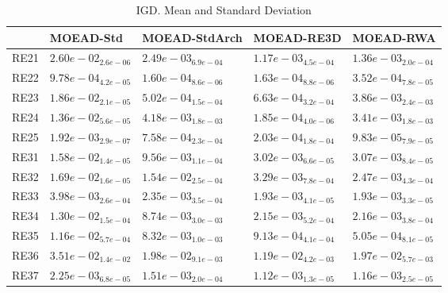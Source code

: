 \documentclass{article}
\begin{document}
\begin{table}
\caption{IGD. Mean and Standard Deviation}
\label{table: IGD}
\centering
\begin{scriptsize}
\begin{tabular}{lllll}
\hline & MOEAD-Std & MOEAD-StdArch & MOEAD-RE3D &  MOEAD-RWA\\
\hline 
RE21 & $  2.60e-02_{ 2.6e-06}$ & $  2.49e-03_{ 6.9e-04}$ & \cellcolor{gray95}$  1.17e-03_{ 4.5e-04}$ & \cellcolor{gray25}$  1.36e-03_{ 2.0e-04}$ \\
RE22 & $  9.78e-04_{ 4.2e-05}$ & \cellcolor{gray95}$  1.60e-04_{ 8.6e-06}$ & \cellcolor{gray25}$  1.63e-04_{ 8.8e-06}$ & $  3.52e-04_{ 7.8e-05}$ \\
RE23 & $  1.86e-02_{ 2.1e-05}$ & \cellcolor{gray95}$  5.02e-04_{ 1.5e-04}$ & \cellcolor{gray25}$  6.63e-04_{ 3.2e-04}$ & $  3.86e-03_{ 2.4e-03}$ \\
RE24 & $  1.36e-02_{ 5.6e-05}$ & $  4.18e-03_{ 1.8e-03}$ & \cellcolor{gray95}$  1.85e-04_{ 4.0e-06}$ & \cellcolor{gray25}$  3.41e-03_{ 1.8e-03}$ \\
RE25 & $  1.92e-03_{ 2.9e-07}$ & $  7.58e-04_{ 2.3e-04}$ & \cellcolor{gray25}$  2.03e-04_{ 1.8e-04}$ & \cellcolor{gray95}$  9.83e-05_{ 7.9e-05}$ \\
RE31 & $  1.58e-02_{ 1.4e-05}$ & $  9.56e-03_{ 1.1e-04}$ & \cellcolor{gray95}$  3.02e-03_{ 6.6e-05}$ & \cellcolor{gray25}$  3.07e-03_{ 8.4e-05}$ \\
RE32 & $  1.69e-02_{ 1.6e-05}$ & $  1.54e-02_{ 2.5e-04}$ & \cellcolor{gray25}$  3.29e-03_{ 7.8e-04}$ & \cellcolor{gray95}$  2.47e-03_{ 4.3e-04}$ \\
RE33 & $  3.98e-03_{ 2.6e-04}$ & $  2.35e-03_{ 3.5e-04}$ & \cellcolor{gray25}$  1.93e-03_{ 4.1e-05}$ & \cellcolor{gray95}$  1.93e-03_{ 3.3e-05}$ \\
RE34 & $  1.30e-02_{ 1.5e-04}$ & $  8.74e-03_{ 3.0e-03}$ & \cellcolor{gray95}$  2.15e-03_{ 5.2e-04}$ & \cellcolor{gray25}$  2.16e-03_{ 3.8e-04}$ \\
RE35 & $  1.16e-02_{ 5.7e-04}$ & $  8.32e-03_{ 1.0e-03}$ & \cellcolor{gray25}$  9.13e-04_{ 4.1e-04}$ & \cellcolor{gray95}$  5.05e-04_{ 8.1e-05}$ \\
RE36 & $  3.51e-02_{ 1.4e-02}$ & $  1.98e-02_{ 9.1e-03}$ & \cellcolor{gray95}$  1.19e-02_{ 4.2e-03}$ & \cellcolor{gray25}$  1.97e-02_{ 5.7e-03}$ \\
RE37 & $  2.25e-03_{ 6.8e-05}$ & $  1.51e-03_{ 2.0e-04}$ & \cellcolor{gray95}$  1.12e-03_{ 1.3e-05}$ & \cellcolor{gray25}$  1.16e-03_{ 2.5e-05}$ \\

\end{tabular}
\end{scriptsize}
\end{table}
\end{document}
